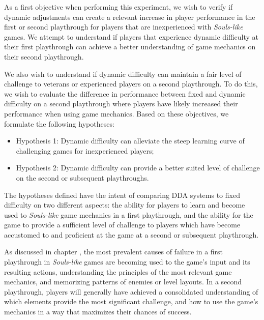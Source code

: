 As a first objective when performing this experiment, we wish to verify if dynamic adjustments can create a relevant increase in player performance in the first or second playthrough for players that are inexperienced with \emph{Souls-like} games. We attempt to understand if players that experience dynamic difficulty at their first playthrough can achieve a better understanding of game mechanics on their second playthrough.

We also wish to understand if dynamic difficulty can maintain a fair level of challenge to veterans or experienced players on a second playthrough. To do this, we wish to evaluate the difference in performance between fixed and dynamic difficulty on a second playthrough where players have likely increased their performance when using game mechanics. Based on these objectives, we formulate the following hypotheses:

\begin{itemize}
    \item{Hypothesis 1: Dynamic difficulty can alleviate the steep learning curve of challenging games for inexperienced players;}
    \item{Hypothesis 2: Dynamic difficulty can provide a better suited level of challenge on the second or subsequent playthroughs.}
\end{itemize}

The hypotheses defined have the intent of comparing DDA systems to fixed difficulty on two different aspects: the ability for players to learn and become used to \emph{Souls-like} game mechanics in a first playthrough, and the ability for the game to provide a sufficient level of challenge to players which have become accustomed to and proficient at the game at a second or subsequent playthrough.


As discussed in chapter \label{ch:analysis-dark-souls}, the most prevalent causes of failure in a first playthrough in \emph{Souls-like} games are becoming used to the game's input and its resulting actions, understanding the principles of the most relevant game mechanics, and memorizing patterns of enemies or level layouts. In a second playthrough, players will generally have achieved a consolidated understanding of which elements provide the most significant challenge, and how to use the game's mechanics in a way that maximizes their chances of success.

